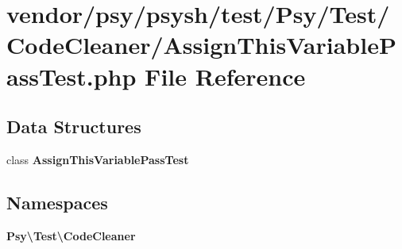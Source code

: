 \section{vendor/psy/psysh/test/\+Psy/\+Test/\+Code\+Cleaner/\+Assign\+This\+Variable\+Pass\+Test.php File Reference}
\label{_assign_this_variable_pass_test_8php}
\subsection*{Data Structures}
\begin{DoxyCompactItemize}
\item 
class {\bf Assign\+This\+Variable\+Pass\+Test}
\end{DoxyCompactItemize}
\subsection*{Namespaces}
\begin{DoxyCompactItemize}
\item 
 {\bf Psy\textbackslash{}\+Test\textbackslash{}\+Code\+Cleaner}
\end{DoxyCompactItemize}
